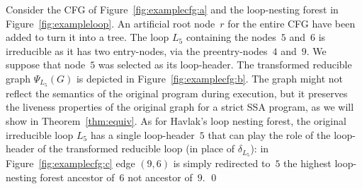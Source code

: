 \begin{example}
	Consider the CFG of Figure~\ref{fig:examplecfg:a} and the loop-nesting forest in Figure~\ref{fig:exampleloop}.
	An artificial root node~$r$ for the entire CFG have been added to turn it into a tree.
	The loop $L_5$ containing the nodes~$5$ and~$6$ is irreducible as it has two entry-nodes, via the preentry-nodes~$4$ and~$9$.
	We suppose that node~$5$ was selected as its loop-header.
	The transformed reducible graph $\Psi_{L_5}(G)$ is depicted in Figure~\ref{fig:examplecfg:b}.
	The graph might not reflect the semantics of the original program during execution, but it preserves the liveness properties of the original graph for a strict SSA program, as we will show in Theorem~\ref{thm:equiv}.
	As for Havlak's loop nesting forest, the original irreducible loop $L_5$ has a single loop-header~$5$ that can play the role of the loop-header of the transformed reducible loop (in place of $\delta_{L_5}$):
	in Figure~\ref{fig:examplecfg:c} edge $(9,6)$ is simply redirected to~$5$ the highest loop-nesting forest ancestor of~$6$ not ancestor of~$9$.
	\qed
\end{example}

\newcommand{\couple}[2]{\langle#1,#2\rangle}
\def\sep{,$ $}

